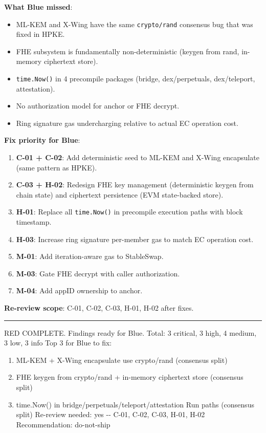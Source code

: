 \documentclass[
]{article}
\providecommand{\tightlist}{%
  \setlength{\itemsep}{0pt}\setlength{\parskip}{0pt}}
\begin{document}
\textbf{What Blue missed}:

\begin{itemize}
\tightlist
\item
  ML-KEM and X-Wing have the same \texttt{crypto/rand} consensus bug
  that was fixed in HPKE.
\item
  FHE subsystem is fundamentally non-deterministic (keygen from rand,
  in-memory ciphertext store).
\item
  \texttt{time.Now()} in 4 precompile packages (bridge, dex/perpetuals,
  dex/teleport, attestation).
\item
  No authorization model for anchor or FHE decrypt.
\item
  Ring signature gas undercharging relative to actual EC operation cost.
\end{itemize}

\textbf{Fix priority for Blue}:

\begin{enumerate}
\def\labelenumi{\arabic{enumi}.}
\tightlist
\item
  \textbf{C-01 + C-02}: Add deterministic seed to ML-KEM and X-Wing
  encapsulate (same pattern as HPKE).
\item
  \textbf{C-03 + H-02}: Redesign FHE key management (deterministic
  keygen from chain state) and ciphertext persistence (EVM state-backed
  store).
\item
  \textbf{H-01}: Replace all \texttt{time.Now()} in precompile execution
  paths with block timestamp.
\item
  \textbf{H-03}: Increase ring signature per-member gas to match EC
  operation cost.
\item
  \textbf{M-01}: Add iteration-aware gas to StableSwap.
\item
  \textbf{M-03}: Gate FHE decrypt with caller authorization.
\item
  \textbf{M-04}: Add appID ownership to anchor.
\end{enumerate}

\textbf{Re-review scope}: C-01, C-02, C-03, H-01, H-02 after fixes.

\begin{center}\rule{0.5\linewidth}{0.5pt}\end{center}

RED COMPLETE. Findings ready for Blue. Total: 3 critical, 3 high, 4
medium, 3 low, 3 info Top 3 for Blue to fix:

\begin{enumerate}
\def\labelenumi{\arabic{enumi}.}
\tightlist
\item
  ML-KEM + X-Wing encapsulate use crypto/rand (consensus split)
\item
  FHE keygen from crypto/rand + in-memory ciphertext store (consensus
  split)
\item
  time.Now() in bridge/perpetuals/teleport/attestation Run paths
  (consensus split) Re-review needed: yes -\/- C-01, C-02, C-03, H-01,
  H-02 Recommendation: do-not-ship
\end{enumerate}
\end{document}

